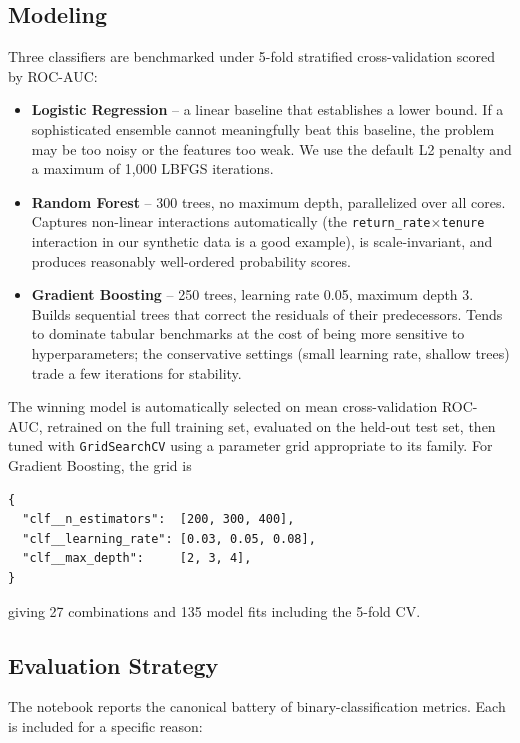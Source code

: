 \documentclass[11pt,a4paper]{article}
\begin{document}
\subsection{Modeling}

Three classifiers are benchmarked under 5-fold stratified
cross-validation scored by ROC-AUC:

\begin{itemize}
  \item \textbf{Logistic Regression} -- a linear baseline that
        establishes a lower bound. If a sophisticated ensemble cannot
        meaningfully beat this baseline, the problem may be too noisy
        or the features too weak. We use the default L2 penalty and
        a maximum of 1{,}000 LBFGS iterations.
  \item \textbf{Random Forest} -- 300 trees, no maximum depth,
        parallelized over all cores. Captures non-linear interactions
        automatically (the \texttt{return\_rate}$\times$\texttt{tenure}
        interaction in our synthetic data is a good example), is
        scale-invariant, and produces reasonably well-ordered
        probability scores.
  \item \textbf{Gradient Boosting} -- 250 trees, learning rate 0.05,
        maximum depth 3. Builds sequential trees that correct the
        residuals of their predecessors. Tends to dominate tabular
        benchmarks at the cost of being more sensitive to
        hyperparameters; the conservative settings (small learning
        rate, shallow trees) trade a few iterations for stability.
\end{itemize}

The winning model is automatically selected on mean cross-validation
ROC-AUC, retrained on the full training set, evaluated on the held-out
test set, then tuned with \texttt{GridSearchCV} using a parameter grid
appropriate to its family. For Gradient Boosting, the grid is
\begin{lstlisting}
{
  "clf__n_estimators":  [200, 300, 400],
  "clf__learning_rate": [0.03, 0.05, 0.08],
  "clf__max_depth":     [2, 3, 4],
}
\end{lstlisting}
giving 27 combinations and 135 model fits including the 5-fold CV.

\subsection{Evaluation Strategy}

The notebook reports the canonical battery of binary-classification
metrics. Each is included for a specific reason:
\end{document}
